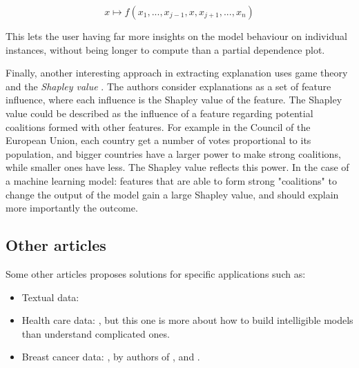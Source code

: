\documentclass[a4paper]{article}
\begin{document}
\[
	x \mapsto f(x_1, ..., x_{j-1}, x, x_{j+1}, ..., x_n)
\]

This lets the user having far more insights on the model behaviour on individual instances, without being longer to compute than a partial dependence plot.

Finally, another interesting approach in extracting explanation uses game theory and the \textit{Shapley value} \cite{gametheory}. The authors consider explanations as a set of feature influence, where each influence is the Shapley value of the feature. The Shapley value could be described as the influence of a feature regarding potential coalitions formed with other features. For example in the Council of the European Union, each country get a number of votes proportional to its population, and bigger countries have a larger power to make strong coalitions, while smaller ones have less. The Shapley value reflects this power. In the case of a machine learning model: features that are able to form strong "coalitions" to change the output of the model gain a large Shapley value, and should explain more importantly the outcome. 

\subsection{Other articles}

Some other articles proposes solutions for specific applications such as:

\begin{itemize}
	\item Textual data:  \cite{documentclassif}
	\item Health care data:  \cite{healthcare}, but this one is more about how to build intelligible models than understand complicated ones.
	\item Breast cancer data: , by authors of \cite{gametheory}, \cite{sensitivity} and \cite{explainingclassif}.
\end{itemize}

\printbibliography
\end{document}
